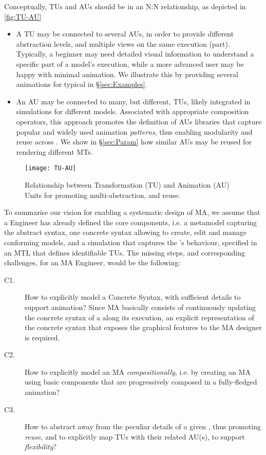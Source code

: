 Conceptually, TUs and AUs should be in an \textsf{N:N} relationship, as depicted
in \autoref{fig:TU-AU}
\begin{itemize}
	\item A TU may be connected to several AUs, in order to provide different abstraction
   levels, and multiple views on the same execution (part). Typically, a beginner
   may need detailed visual information to understand a specific part of a model's
   execution, while a more advanced user may be happy with minimal animation. We
   illustrate this by providing several animations for typical \DSLs in \S \ref{sec:Examples}.

   \item An AU may be connected to many, but different, TUs, likely integrated in simulations
   for different models. Associated with appropriate composition operators, this
   approach promotes the definition of AUs libraries that capture popular and 
   widely used animation \emph{patterns}, thus enabling modularity and reuse 
   across \DSLs. We show in \S \ref{sec:Param} how similar AUs may be reused for
   rendering different MTs.
\end{itemize}

\begin{figure}[t]%
   \texttt{[image: TU-AU]}%
   \caption{Relationship between Transformation (TU) and Animation (AU) Units for
   promoting multi-abstraction, and reuse.}%
   \label{fig:TU-AU}%
\end{figure}

To summarise our vision for enabling a systematic design of MA, we assume that a 
\DSL Engineer has already defined the core components, i.e. a metamodel capturing
the abstract syntax, one concrete syntax allowing to create, edit and manage 
conforming models, and a simulation that captures the \DSL's behaviour, specified
in an MTL that defines identifiable TUs. The missing steps, and corresponding challenges,
for an MA Engineer, would be the following:

\begin{description}
   \item[C1.] How to explicitly model a Concrete Syntax, with sufficient details
   to support animation? Since MA basically consists of continuously updating the
   concrete syntax of a \DSL along its execution, an explicit representation of the
   concrete syntax that exposes the graphical features to the MA designer is 
   required.
   
   \item[C2.] How to explicitly model an MA \emph{compositionally}, i.e. by creating an
   MA using basic components that are progressively composed in a fully-fledged
   animation? 
   
   \item[C3.] How to abstract away from the peculiar details of a given \DSL, thus
   promoting \emph{reuse}, and to explicitly map TUs with their related AU(s), to
   support \emph{flexibility}?
\end{description}
